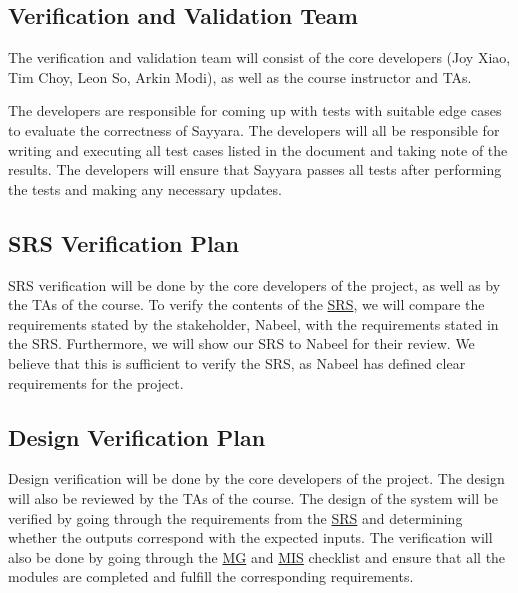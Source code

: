\documentclass[12pt, titlepage]{article}
\begin{document}

\subsection{Verification and Validation Team}

The verification and validation team will consist of the core developers (Joy Xiao, Tim Choy, Leon
So, Arkin Modi), as well as the course instructor and TAs.

The developers are responsible for coming up with tests with suitable edge cases to evaluate the
correctness of Sayyara. The developers will all be responsible for writing and executing all test
cases listed in the document and taking note of the results. The developers will ensure that
Sayyara passes all tests after performing the tests and making any necessary updates.

\subsection{SRS Verification Plan}

SRS verification will be done by the core developers of the project, as well as by the TAs of the
course. To verify the contents of the
\href{https://github.com/arkinmodi/project-sayyara/blob/main/docs/SRS/SRS.pdf}{SRS}, we will
compare the requirements stated by the stakeholder, Nabeel, with the requirements stated in the
SRS. Furthermore, we will show our SRS to Nabeel for their review. We believe that this is
sufficient to verify the SRS, as Nabeel has defined clear requirements for the project.



\subsection{Design Verification Plan}

Design verification will be done by the core developers of the project. The design will also be
reviewed by the TAs of the course. The design of the system will be verified by going through the
requirements from the
\href{https://github.com/arkinmodi/project-sayyara/blob/main/docs/SRS/SRS.pdf}{SRS} and determining
whether the outputs correspond with the expected inputs. The verification will also be done by
going through the
\href{https://github.com/arkinmodi/project-sayyara/blob/main/docs/Design/MG/MG.pdf}{MG} and
\href{https://github.com/arkinmodi/project-sayyara/blob/main/docs/Design/MIS/MIS.pdf}{MIS}
checklist and ensure that all the modules are completed and fulfill the corresponding requirements.
\end{document}
